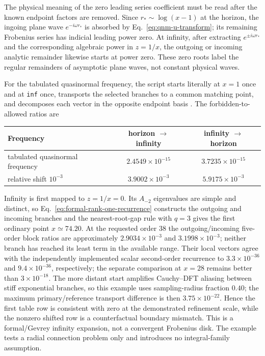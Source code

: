 \documentclass[11pt]{article}
\begin{document}
The physical meaning of the zero leading series coefficient must be read after the known
endpoint factors are removed.  Since $r_*\sim\log(x-1)$ at the horizon, the ingoing plane
wave $e^{-i\omega r_*}$ is absorbed by Eq.~\eqref{eq:qnm-u-transform}; its remaining
Frobenius series has indicial leading power zero.  At infinity, after extracting
$e^{\pm i\omega r_*}$ and the corresponding algebraic power in $z=1/x$, the outgoing or
incoming analytic remainder likewise starts at power zero.  These zero roots label the
regular remainders of asymptotic plane waves, not constant physical waves.

For the tabulated quasinormal frequency, the script starts literally at $x=1$ once and at
\texttt{inf} once, transports the selected branches to a common matching point, and
decomposes each vector in the opposite endpoint basis
\cite{Leaver:1985ax,Berti:2009kk}.  The forbidden-to-allowed ratios are
\begin{center}
\begin{tabular}{lcc}
\toprule
Frequency & horizon $\to$ infinity & infinity $\to$ horizon\\
\midrule
tabulated quasinormal frequency & $2.4549\times10^{-15}$ & $3.7235\times10^{-15}$\\
relative shift $10^{-3}$ & $3.9002\times10^{-3}$ & $5.9175\times10^{-3}$\\
\bottomrule
\end{tabular}
\end{center}
Infinity is first mapped to $z=1/x=0$.  Its $A_{-2}$ eigenvalues are simple and distinct, so
Eq.~\eqref{eq:formal-rank-one-recurrence} constructs the outgoing and incoming branches and
the nearest-root-gap rule with $q=3$ gives the first ordinary point $x\simeq74.20$.  At the
requested order 38 the outgoing/incoming five-order block ratios are approximately
$2.9034\times10^{-3}$ and $3.1998\times10^{-3}$; neither branch has reached its least term
in the available range. Their local vectors agree with the independently implemented scalar
second-order recurrence to $3.3\times10^{-36}$ and $9.4\times10^{-36}$, respectively; the
separate comparison at $x=28$ remains better than $3\times10^{-18}$.  The more distant
start amplifies Cauchy--DFT aliasing between stiff exponential branches, so this example
uses sampling-radius fraction $0.40$; the maximum primary/reference transport difference is
then $3.75\times10^{-22}$.
Hence the first table row is consistent with zero at the demonstrated
refinement scale, while the nonzero shifted row is a counterfactual boundary mismatch.  This
is a formal/Gevrey infinity expansion, not a convergent Frobenius disk.  The example tests a
radial connection problem only and introduces no integral-family assumption.
\end{document}
